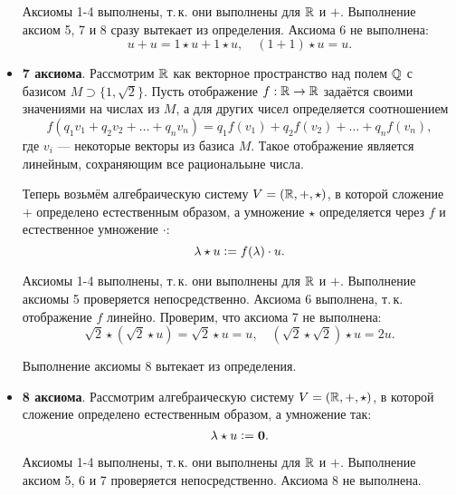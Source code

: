 \begin{remark}
\begin{itemize}
            Аксиомы 1-4 выполнены, т.\,к. они выполнены для $\mathbb{R}$ и $+$. Выполнение аксиом 5, 7 и 8 сразу вытекает из определения. Аксиома 6 не выполнена:
            $$
            u + u = 1 \star u + 1 \star u,\quad (1 + 1) \star u = u.
            $$
        \item \textbf{7 аксиома}. Рассмотрим $\mathbb{R}$ как векторное пространство над полем $\mathbb{Q}$ с базисом $M \supset \{1, \sqrt{2}\}$. Пусть отображение $f: \mathbb{R} \rightarrow \mathbb{R}$ задаётся своими значениями на числах из $M$, а для других чисел определяется соотношением
            $$
            f(q_1v_1 + q_2v_2 + \ldots + q_nv_n) = q_1f(v_1) + q_2f(v_2) + \ldots + q_nf(v_n),
            $$
            где $v_i$ --- некоторые векторы из базиса $M$. Такое отображение является линейным, сохраняющим все рациональыне числа.

            Теперь возьмём алгебраическую систему $V = (\mathbb{R}, +, \star)$, в которой сложение $+$ определено естественным образом, а умножение $\star$ определяется через $f$ и естественное умножение $\boldsymbol{\cdot}$:
            $$
            \lambda \star u \vcentcolon = f(\lambda) \cdot u.
            $$

            Аксиомы 1-4 выполнены, т.\,к. они выполнены для $\mathbb{R}$ и $+$. Выполнение аксиомы 5 проверяется непосредственно. Аксиома 6 выполнена, т.\,к. отображение $f$ линейно. Проверим, что аксиома 7 не выполнена:
            $$
            \sqrt{2} \star (\sqrt{2} \star u) = \sqrt{2} \star u = u,\quad (\sqrt{2} \star \sqrt{2}) \star u = 2u.
            $$

            Выполнение аксиомы 8 вытекает из определения.
        \item \textbf{8 аксиома}. Рассмотрим алгебраическую систему $V = (\mathbb{R}, +, \star)$, в которой сложение определено естественным образом, а умножение так:
            $$
            \lambda \star u \vcentcolon = \boldsymbol{0}.
            $$

            Аксиомы 1-4 выполнены, т.\,к. они выполнены для $\mathbb{R}$ и $+$. Выполнение аксиом 5, 6 и 7 проверяется непосредственно. Аксиома 8 не выполнена.
    \end{itemize}
\end{remark}

